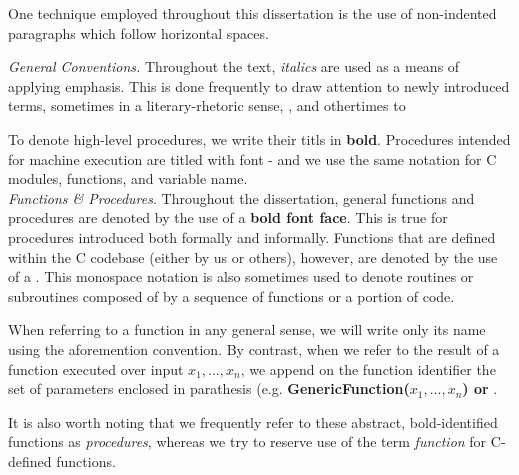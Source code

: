 One technique employed throughout this dissertation is the use of non-indented paragraphs which follow horizontal spaces. 

\noindent
\textit{General Conventions.} Throughout the text, \textit{italics} are used as a means of applying emphasis. This is done frequently to draw attention to newly introduced terms, sometimes in a literary-rhetoric sense, , and othertimes to 

To denote high-level procedures, we write their titls in \textbf{bold}. Procedures intended for machine execution are titled with  font - and we use the same notation for C modules, functions, and variable name.\\

\noindent
\textit{Functions \& Procedures}. Throughout the dissertation, general functions and procedures are denoted by the use of a \textbf{bold font face}. This is true for procedures introduced both formally and informally. Functions that are defined within the \sidh C codebase (either by us or others), however, are denoted by the use of a . This monospace notation is also sometimes used to denote routines or subroutines composed of by a sequence of functions or a portion of code. 

When referring to a function in any general sense, we will write only its name using the aforemention convention. By contrast, when we refer to the result of a function executed over input $x_{1}, ..., x_{n}$, we append on the function identifier the set of parameters enclosed in parathesis (e.g. \textbf{GenericFunction($x_{1}, ..., x_{n}$) or }. 

It is also worth noting that we frequently refer to these abstract, bold-identified functions as \textit{procedures}, whereas we try to reserve use of the term \textit{function} for C-defined \sidh functions.  

